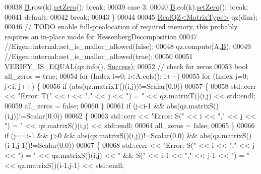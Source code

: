 \begin{DoxyCode}
00038     \hyperlink{group___core___module_class_eigen_1_1_matrix}{B}.row(k).\hyperlink{class_eigen_1_1_plain_object_base_ac21ad5f989f320e46958b75ac8d9a1da}{setZero}(); \textcolor{keywordflow}{break};
00039   \textcolor{keywordflow}{case} 3:
00040     \hyperlink{group___core___module_class_eigen_1_1_matrix}{B}.col(k).\hyperlink{class_eigen_1_1_plain_object_base_ac21ad5f989f320e46958b75ac8d9a1da}{setZero}(); \textcolor{keywordflow}{break};
00041   \textcolor{keywordflow}{default}:
00042     \textcolor{keywordflow}{break};
00043   \}
00044 
00045   \hyperlink{group___eigenvalues___module}{RealQZ<MatrixType>} qz(dim);
00046   \textcolor{comment}{// TODO enable full-prealocation of required memory, this probably requires an in-place mode for
       HessenbergDecomposition}
00047   \textcolor{comment}{//Eigen::internal::set\_is\_malloc\_allowed(false);}
00048   qz.compute(A,\hyperlink{group___core___module_class_eigen_1_1_matrix}{B});
00049   \textcolor{comment}{//Eigen::internal::set\_is\_malloc\_allowed(true);}
00050   
00051   VERIFY\_IS\_EQUAL(qz.info(), \hyperlink{group__enums_gga85fad7b87587764e5cf6b513a9e0ee5ea52581b035f4b59c203b8ff999ef5fcea}{Success});
00052   \textcolor{comment}{// check for zeros}
00053   \textcolor{keywordtype}{bool} all\_zeros = \textcolor{keyword}{true};
00054   \textcolor{keywordflow}{for} (Index i=0; i<A.cols(); i++)
00055     \textcolor{keywordflow}{for} (Index j=0; j<i; j++) \{
00056       \textcolor{keywordflow}{if} (abs(qz.matrixT()(i,j))!=Scalar(0.0))
00057       \{
00058         std::cerr << \textcolor{stringliteral}{"Error: T("} << i << \textcolor{stringliteral}{","} << j << \textcolor{stringliteral}{") = "} << qz.matrixT()(i,j) << std::endl;
00059         all\_zeros = \textcolor{keyword}{false};
00060       \}
00061       \textcolor{keywordflow}{if} (j<i-1 && abs(qz.matrixS()(i,j))!=Scalar(0.0))
00062       \{
00063         std::cerr << \textcolor{stringliteral}{"Error: S("} << i << \textcolor{stringliteral}{","} << j << \textcolor{stringliteral}{") = "} << qz.matrixS()(i,j) << std::endl;
00064         all\_zeros = \textcolor{keyword}{false};
00065       \}
00066       \textcolor{keywordflow}{if} (j==i-1 && j>0 && abs(qz.matrixS()(i,j))!=Scalar(0.0) && abs(qz.matrixS()(i-1,j-1))!=Scalar(0.0))
00067       \{
00068         std::cerr << \textcolor{stringliteral}{"Error: S("} << i << \textcolor{stringliteral}{","} << j << \textcolor{stringliteral}{") = "} << qz.matrixS()(i,j)  << \textcolor{stringliteral}{" && S("} << i-1 << \textcolor{stringliteral}{","}
       << j-1 << \textcolor{stringliteral}{") = "} << qz.matrixS()(i-1,j-1) << std::endl;

\end{DoxyCode}
